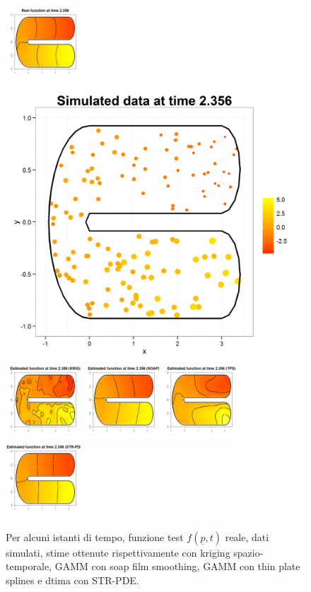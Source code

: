 \documentclass[a4paper,11pt,twoside,openright]{book}							%
\begin{document}
\begin{landscape}
\begin{figure}
\includegraphics[width=0.25\textwidth]{immagini/simulazioni/REALEtempo4.png}
\includegraphics[height=0.25\textwidth]{immagini/simulazioni/Dati_tempo4.png}
\includegraphics[width=0.25\textwidth]{immagini/simulazioni/KRIGtempo4.png}
\includegraphics[width=0.25\textwidth]{immagini/simulazioni/SOAPtempo4.png}
\includegraphics[width=0.25\textwidth]{immagini/simulazioni/TPStempo4.png}
\includegraphics[width=0.25\textwidth]{immagini/simulazioni/STSRtempo4.png}

\caption{Per alcuni istanti di tempo, funzione test $f(\underline p,t)$ reale, dati simulati, stime ottenute rispettivamente con kriging spazio-temporale, GAMM con soap film smoothing, GAMM con thin plate splines e dtima con STR-PDE.}
\label{fig:confronto_altri_metodi_nocov}
\end{figure}
\end{landscape}
\end{document}
